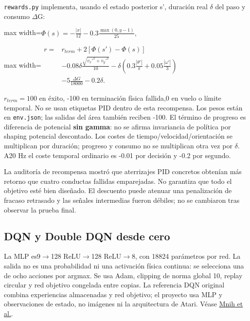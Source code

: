 \documentclass[12pt,a4paper]{article}
\begin{document}
\textcolor{Accent}{\nolinkurl{rewards.py}} implementa,\allowbreak{} usando el estado posterior s',\allowbreak{} duración real \ensuremath{\delta} del paso y consumo \ensuremath{\Delta}G:



\begin{center}\begin{adjustbox}{max width=\linewidth}$\displaystyle \Phi(s)=-\frac{|x|}{12}-0.3\frac{\max(0,y-1)}{25},$\end{adjustbox}\end{center}


\begin{center}\begin{adjustbox}{max width=\linewidth}$\displaystyle \begin{aligned}r={}&r_{term}+2[\Phi(s')-\Phi(s)]
\\ &-0.08\delta\frac{\sqrt{v_x'^2+v_y'^2}}{10}
-\delta\left(0.3\frac{|\theta'|}{\pi}+0.05\frac{|\omega'|}{3}\right)
\\ &-5\frac{\Delta G}{18000}-0.2\delta.\end{aligned}$\end{adjustbox}\end{center}



$r_{term}=100$ en éxito,\allowbreak{} -100 en terminación física fallida,\allowbreak{}0 en vuelo o límite temporal. No se usan etiquetas PID dentro de esta recompensa. Los pesos están en \nolinkurl{env.json}; las salidas del área también reciben -100. El término de progreso es diferencia de potencial \textbf{sin gamma}: no se afirma invariancia de política por shaping potencial descontado. Los costes de tiempo/\allowbreak{}velocidad/\allowbreak{}orientación se multiplican por duración; progreso y consumo no se multiplican otra vez por \ensuremath{\delta}. A20 Hz el coste temporal ordinario es -0.01 por decisión y -0.2 por segundo.


La auditoría de recompensa mostró que aterrizajes PID concretos obtenían más retorno que cuatro conductas fallidas emparejadas. No garantiza que todo el objetivo esté bien diseñado. El descuento puede atenuar una penalización de fracaso retrasado y las señales intermedias fueron débiles; no se cambiaron tras observar la prueba final.



\subsection{DQN y Double DQN desde cero}
La MLP es9\ensuremath{\rightarrow}128 ReLU\ensuremath{\rightarrow}128 ReLU\ensuremath{\rightarrow}8,\allowbreak{} con 18824 parámetros por red. La salida no es una probabilidad ni una activación física continua: se selecciona una de ocho acciones por argmax. Se usa Adam,\allowbreak{} clipping de norma global 10,\allowbreak{} replay circular y red objetivo congelada entre copias. La referencia DQN original combina experiencias almacenadas y red objetivo; el proyecto usa MLP y observaciones de estado,\allowbreak{} no imágenes ni la arquitectura de Atari. Véase \href{https://storage.googleapis.com/deepmind-media/dqn/DQNNaturePaper.pdf}{Mnih et al.}.
\end{document}
